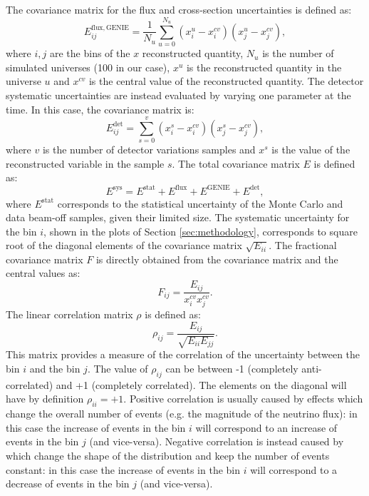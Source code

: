 The covariance matrix for the flux and cross-section uncertainties is defined as:
\begin{equation}
    E_{ij}^{\mathrm{flux, GENIE}} = \frac{1}{N_{u}} \sum^{N_{u}}_{u=0} (x^{u}_{i} - x^{cv}_{i}) (x^{u}_{j} - x^{cv}_{j}),\label{eq:covariance}
\end{equation}
where $i,j$ are the bins of the $x$ reconstructed quantity, $N_{u}$ is the number of simulated universes (100 in our case), $x^{u}$ is the reconstructed quantity in the universe $u$ and $x^{cv}$ is the central value of the reconstructed quantity. 
The detector systematic uncertainties are instead evaluated by varying one parameter at the time. In this case, the covariance matrix is:
\begin{equation}
    E_{ij}^{\mathrm{det}} = \sum^{v}_{s=0} (x^{s}_{i} - x^{cv}_{i}) (x^{s}_{j} - x^{cv}_{j}),\label{eq:cov_det}
\end{equation}
where $v$ is the number of detector variations samples and $x^{s}$ is the value of the reconstructed variable in the sample $s$. The total covariance matrix $E$ is defined as:
\begin{equation}
    E^{\mathrm{sys}} = E^{\mathrm{stat}} + E^{\mathrm{flux}} + E^{\mathrm{GENIE}} + E^{\mathrm{det}},\label{eq:cov_tot}
\end{equation}
where $E^{\mathrm{stat}}$ corresponds to the statistical uncertainty of the Monte Carlo and data beam-off samples, given their limited size. 
The systematic uncertainty for the bin $i$, shown in the plots of Section \ref{sec:methodology}, corresponds to square root of the diagonal elements of the covariance matrix $\sqrt{E_{ii}}$. The fractional covariance matrix $F$ is directly obtained from the covariance matrix and the central values as:
\begin{equation} 
    F_{ij} = \frac{E_{ij}}{x_{i}^{cv} x_{j}^{cv}}.
\end{equation}
The linear correlation matrix $\rho$ is defined as:
\begin{equation}
    \rho_{ij} = \frac{E_{ij}}{\sqrt{E_{ii}E_{jj}}}.
\end{equation}
This matrix provides a measure of the correlation of the uncertainty between the bin $i$ and the bin $j$. The value of $\rho_{ij}$ can be between -1 (completely anti-correlated) and +1 (completely correlated). The elements on the diagonal will have by definition $\rho_{ii}=+1$. 
Positive correlation is usually caused by effects which change the overall number of events (e.g. the magnitude of the neutrino flux): in this case the increase of events in the bin $i$ will correspond to an increase of events in the bin $j$ (and vice-versa). Negative correlation is instead caused by which change the shape of the distribution and keep the number of events constant: in this case the increase of events in the bin $i$ will correspond to a decrease of events in the bin $j$ (and vice-versa).

